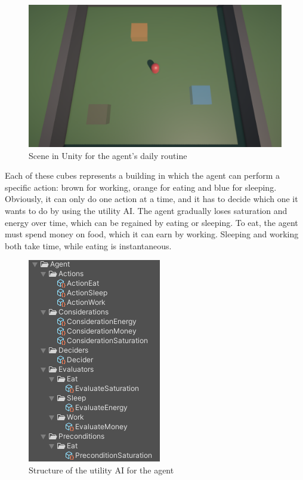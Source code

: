 \begin{figure}[H]
	\centering
		\includegraphics[scale=0.3]{images/utility_ai_scene_daily_routine.png}
	\caption{Scene in Unity for the agent's daily routine}
	\label{fig:utility_ai_scene_daily_routine}
\end{figure}

Each of these cubes represents a building in which the agent can perform a specific action: brown for working, orange for eating and blue for sleeping. Obviously, it can only do one action at a time, and it has to decide which one it wants to do by using the utility AI. The agent gradually loses saturation and energy over time, which can be regained by eating or sleeping. To eat, the agent must spend money on food, which it can earn by working. Sleeping and working both take time, while eating is instantaneous.

\begin{figure}[H]
	\centering
		\includegraphics[scale=0.6]{images/utility_ai_daily_routine.png}
	\caption{Structure of the utility AI for the agent}
	\label{fig:utility_ai_daily_routine}
\end{figure}

